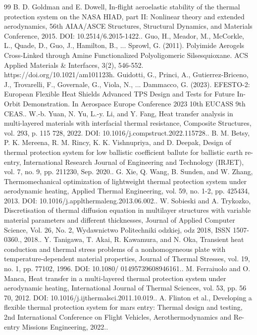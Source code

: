 \documentclass[10pt]{article}
\begin{document}
\begin{sloppypar}
\begin{thebibliography}{99}
 B. D. Goldman and E. Dowell, In-flight aeroelastic stability of the thermal protection system on the NASA HIAD, part II: Nonlinear theory and extended aerodynamics, 56th AIAA/ASCE Structures, Structural Dynamics, and Materials Conference, 2015. DOI: 10.2514/6.2015-1422..
 Guo, H., Meador, M., McCorkle, L., Quade, D., Guo, J., Hamilton, B., ... Sprowl, G. (2011). Polyimide Aerogels Cross-Linked through Amine Functionalized Polyoligomeric Silsesquioxane. ACS Applied Materials \& Interfaces, 3(2), 546-552. https://doi.org/10.1021/am101123h.
 Guidotti, G., Princi, A., Gutierrez-Briceno, J., Trovarelli, F., Governale, G., Viola, N., ... Dammacco, G. (2023). EFESTO-2: European Flexible Heat Shields Advanced TPS Design and Tests for Future In-Orbit Demonstration. In Aerospace Europe Conference 2023  10th EUCASS  9th CEAS..
 W.-b. Yuan, N. Yu, L.-y. Li, and Y. Fang, Heat transfer analysis in multi-layered materials with interfacial thermal resistance, Composite Structures, vol. 293, p. 115 728, 2022. DOI: 10.1016/j.compstruct.2022.115728..
 B. M. Betsy, P. K. Mereena, R. M. Rincy, K. K. Vishnupriya, and D. Deepak, Design of thermal protection system for low ballistic coefficient ballute for ballistic earth re-entry, International Research Journal of Engineering and Technology (IRJET), vol. 7, no. 9, pp. 211230, Sep. 2020..
 G. Xie, Q. Wang, B. Sunden, and W. Zhang, Thermomechanical optimization of lightweight thermal protection system under aerodynamic heating, Applied Thermal Engineering, vol. 59, no. 1-2, pp. 425434, 2013. DOI: 10.1016/j.applthermaleng.2013.06.002..
 W. Sobieski and A. Trykozko, Discretisation of thermal diffusion equation in multilayer structures with variable material parameters and different thicknesses, Journal of Applied Computer Science, Vol. 26, No. 2, Wydawnictwo Politechniki odzkiej, odz 2018, ISSN 1507-0360., 2018..
 Y. Tanigawa, T. Akai, R. Kawamura, and N. Oka, Transient heat conduction and thermal stress problems of a nonhomogeneous plate with temperature-dependent material properties, Journal of Thermal Stresses, vol. 19, no. 1, pp. 77102, 1996. DOI: 10.1080/ 01495739608946161..
 M. Ferraiuolo and O. Manca, Heat transfer in a multi-layered thermal protection system under aerodynamic heating, International Journal of Thermal Sciences, vol. 53, pp. 56 70, 2012. DOI: 10.1016/j.ijthermalsci.2011.10.019..
 A. Flinton et al., Developing a flexible thermal protection system for mars entry: Thermal design and testing, 2nd International Conference on Flight Vehicles, Aerothermodynamics and Re-entry Missions Engineering, 2022..

\end{thebibliography}
\end{sloppypar}
\end{document}
